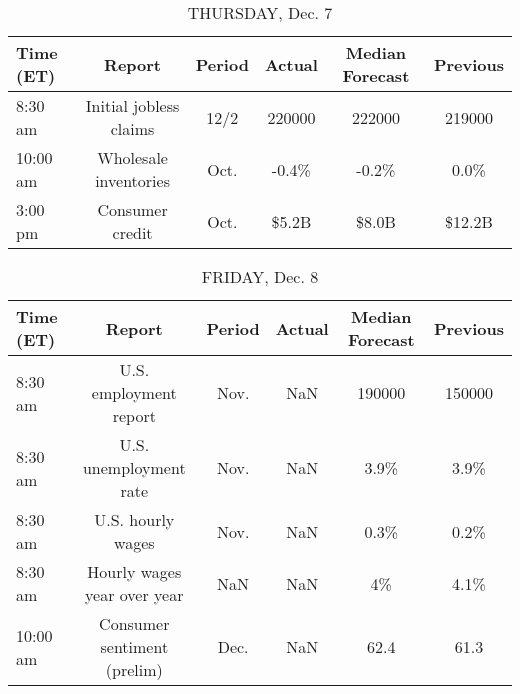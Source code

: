 \documentclass{article}%
\begin{document}
%


\begin{table}[htbp]%
\caption{THURSDAY, Dec. 7}%
\centering%
\begin{adjustbox}{width=1\textwidth}%
\begin{tabular}{lccccc}
\toprule
Time (ET) &                 Report & Period & Actual & Median Forecast & Previous \\
\midrule
  8:30 am & Initial jobless claims &   12/2 & 220000 &          222000 &   219000 \\
 10:00 am &  Wholesale inventories &   Oct. &  -0.4\% &           -0.2\% &     0.0\% \\
  3:00 pm &        Consumer credit &   Oct. &  \$5.2B &           \$8.0B &   \$12.2B \\
\bottomrule
\end{tabular}
%
\end{adjustbox}%
\end{table}

%


\begin{table}[htbp]%
\caption{FRIDAY, Dec. 8}%
\centering%
\begin{adjustbox}{width=1\textwidth}%
\begin{tabular}{lccccc}
\toprule
Time (ET) &                      Report & Period & Actual & Median Forecast & Previous \\
\midrule
  8:30 am &      U.S. employment report &   Nov. &    NaN &          190000 &   150000 \\
  8:30 am &      U.S. unemployment rate &   Nov. &    NaN &            3.9\% &     3.9\% \\
  8:30 am &           U.S. hourly wages &   Nov. &    NaN &            0.3\% &     0.2\% \\
  8:30 am & Hourly wages year over year &    NaN &    NaN &              4\% &     4.1\% \\
 10:00 am & Consumer sentiment (prelim) &   Dec. &    NaN &            62.4 &     61.3 \\
\bottomrule
\end{tabular}
%
\end{adjustbox}%
\end{table}
\end{document}

